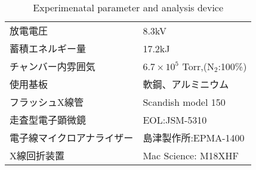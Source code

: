 \begin{table}[h]
	\begin{center}
		\begin{tabular}[h]{l||l}
			\hline
			放電電圧& 8.3kV\\
			蓄積エネルギー量& 17.2kJ\\
			チャンバー内雰囲気& $6.7 \times 10^5$ Torr,(N$_2$:100\%)\\
			使用基板& 軟鋼、アルミニウム\\\hline
			フラッシュX線管& Scandish model 150\\
			走査型電子顕微鏡& EOL:JSM-5310\\
			電子線マイクロアナライザー& 島津製作所:EPMA-1400\\
			X線回折装置	& Mac Science: M18XHF\\
			\hline
		\end{tabular}
		\caption{Experimenatal parameter and analysis device}
		\label{tab:実験条件共通}
	\end{center}
\end{table}
\newpage
